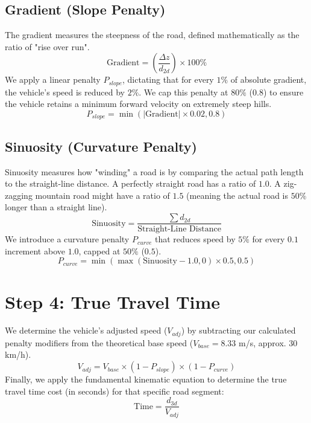 \documentclass[12pt, a4paper]{article}
\begin{document}
\subsection{Gradient (Slope Penalty)}
The gradient measures the steepness of the road, defined mathematically as the ratio of "rise over run".
\begin{equation}
    \text{Gradient} = \left( \frac{\Delta z}{d_{2d}} \right) \times 100\%
\end{equation}
We apply a linear penalty $P_{slope}$, dictating that for every $1\%$ of absolute gradient, the vehicle's speed is reduced by $2\%$. We cap this penalty at $80\%$ ($0.8$) to ensure the vehicle retains a minimum forward velocity on extremely steep hills.
\begin{equation}
    P_{slope} = \min\left(|\text{Gradient}| \times 0.02, 0.8\right)
\end{equation}

\subsection{Sinuosity (Curvature Penalty)}
Sinuosity measures how "winding" a road is by comparing the actual path length to the straight-line distance. A perfectly straight road has a ratio of $1.0$. A zig-zagging mountain road might have a ratio of $1.5$ (meaning the actual road is $50\%$ longer than a straight line).
\begin{equation}
    \text{Sinuosity} = \frac{\sum d_{2d}}{\text{Straight-Line Distance}}
\end{equation}
We introduce a curvature penalty $P_{curve}$ that reduces speed by $5\%$ for every $0.1$ increment above $1.0$, capped at $50\%$ ($0.5$).
\begin{equation}
    P_{curve} = \min\left(\max(\text{Sinuosity} - 1.0, 0) \times 0.5, 0.5\right)
\end{equation}

\section{Step 4: True Travel Time}
We determine the vehicle's adjusted speed ($V_{adj}$) by subtracting our calculated penalty modifiers from the theoretical base speed ($V_{base} = 8.33$ m/s, approx. 30 km/h).
\begin{equation}
    V_{adj} = V_{base} \times (1 - P_{slope}) \times (1 - P_{curve})
\end{equation}
Finally, we apply the fundamental kinematic equation to determine the true travel time cost (in seconds) for that specific road segment:
\begin{equation}
    \text{Time} = \frac{d_{3d}}{V_{adj}}
\end{equation}
\end{document}
